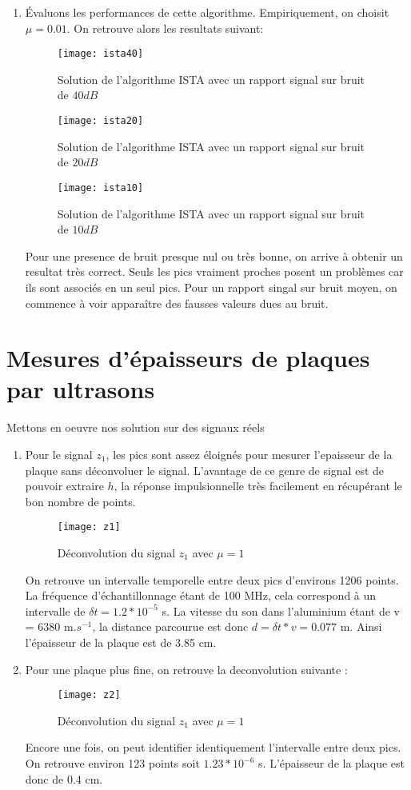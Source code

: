 \documentclass[12pt,a4paper,titlepage]{article}
\begin{document}
\begin{enumerate}
		\item{
		Évaluons les performances de cette algorithme. Empiriquement, on choisit $\mu=0.01$. On retrouve alors les resultats suivant:
		\begin{figure}[H]
    			\texttt{[image: ista40]}
		    	\centering
			\caption{Solution de l'algorithme ISTA avec un rapport signal sur bruit de $40dB$}
		\end{figure}
		\begin{figure}[H]
    			\texttt{[image: ista20]}
		    	\centering
			\caption{Solution de l'algorithme ISTA avec un rapport signal sur bruit de $20dB$}
		\end{figure}
		\begin{figure}[H]
    			\texttt{[image: ista10]}
		    	\centering
			\caption{Solution de l'algorithme ISTA avec un rapport signal sur bruit de $10dB$}
		\end{figure}
		Pour une presence de bruit presque nul ou très bonne, on arrive à obtenir un resultat très correct. Seuls les pics vraiment proches posent un problèmes car ils sont associés en un seul pics. Pour un rapport singal sur bruit moyen, on commence à voir apparaître des fausses valeurs dues au bruit.
		}
	\end{enumerate}
\pagebreak
\section{Mesures d'épaisseurs de plaques par ultrasons}
	Mettons en oeuvre nos solution sur des signaux réels
	\begin{enumerate}
		\item{Pour le signal $z_1$, les pics sont assez éloignés pour mesurer l'epaisseur de la plaque sans déconvoluer le signal. L'avantage de ce genre de signal est de pouvoir extraire $h$, la réponse impulsionnelle très facilement en récupérant le bon nombre de points.
		\begin{figure}[H]
    			\texttt{[image: z1]}
		    	\centering
			\caption{Déconvolution du signal $z_1$ avec $\mu=1$}
		\end{figure}
		On retrouve un intervalle temporelle entre deux pics d'environs 1206 points. La fréquence d'échantillonnage étant de 100 MHz, cela correspond à un intervalle de $\delta t=1.2*10^{-5}$ s. La vitesse du son dans l'aluminium étant de v = 6380 m.$s^{-1}$, la distance parcourue est donc $d=\delta t*v=0.077$ m. Ainsi l'épaisseur de la plaque est de 3.85 cm.
		}
		\item{Pour une plaque plus fine, on retrouve la deconvolution suivante :
		\begin{figure}[H]
    			\texttt{[image: z2]}
		    	\centering
			\caption{Déconvolution du signal $z_1$ avec $\mu=1$}
		\end{figure}
		Encore une fois, on peut identifier identiquement l'intervalle entre deux pics. On retrouve environ 123 points soit $1.23*10^{-6}$ s. L'épaisseur de la plaque est donc de 0.4 cm.		}
	\end{enumerate}
\end{document}

